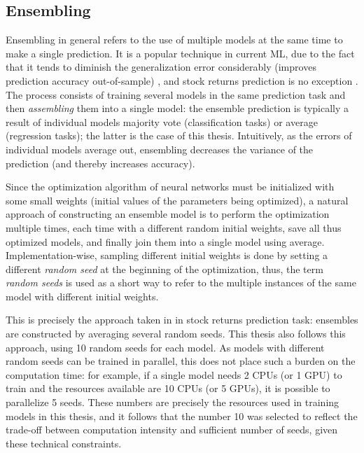 	\subsection{Ensembling}
		\label{chap:ensembling}
		Ensembling in general refers to the use of multiple models at the same time to make a single prediction. It is a popular technique in current ML, due to the fact that it tends to diminish the generalization error considerably (improves prediction accuracy out-of-sample) \citep{zhang2012ensemble}, and stock returns prediction is no exception \citep{gu2020empirical}. The process consists of training several models in the same prediction task and then \textit{assembling} them into a single model: the ensemble prediction is typically a result of individual models majority vote (classification tasks) or average (regression tasks); the latter is the case of this thesis. Intuitively, as the errors of individual models average out, ensembling decreases the variance of the prediction (and thereby increases accuracy). 
		
		Since the optimization algorithm of neural networks must be initialized with some small weights (initial values of the parameters being optimized), a natural approach of constructing an ensemble  model is to perform the optimization multiple times, each time with a different random initial weights, save all thus optimized models, and finally join them into a single model using average. Implementation-wise, sampling different initial weights is done by setting a different \textit{random seed} at the beginning of the optimization, thus, the term \textit{random seeds} is used as a short way to refer to the multiple instances of the same model with different initial weights. 
		
		This is precisely the approach taken in \cite{gu2020empirical} in stock returns prediction task: ensembles are constructed by averaging several random seeds. This thesis also follows this approach, using 10 random seeds for each model. As models with different random seeds can be trained in parallel, this does not place such a burden on the computation time: for example, if a single model needs 2 CPUs (or 1 GPU) to train and the resources available are 10 CPUs (or 5 GPUs), it is possible to parallelize 5 seeds. These numbers are precisely the resources used in training models in this thesis, and it follows that the number 10 was selected to reflect the trade-off between computation intensity and sufficient number of seeds, given these technical constraints.

